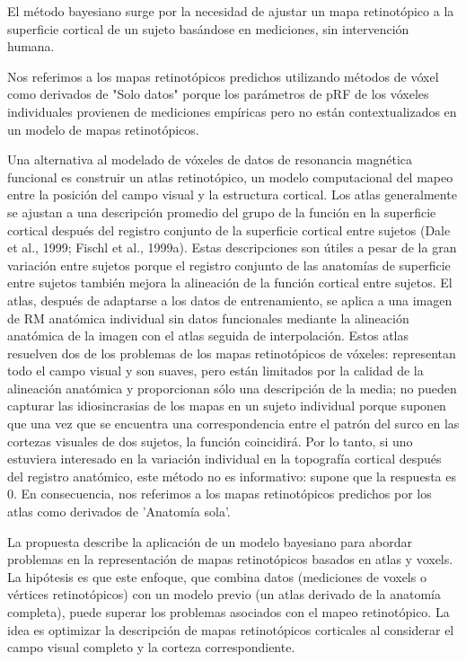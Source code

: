 El m\'etodo bayesiano surge por la necesidad de ajustar un mapa retinotópico a la superficie cortical de un sujeto basándose en mediciones, sin intervención humana. 

 Nos referimos a los mapas retinotópicos predichos utilizando métodos de vóxel como derivados de "Solo datos" porque los parámetros de pRF de los vóxeles individuales provienen de mediciones empíricas pero no están contextualizados en un modelo de mapas retinotópicos.

Una alternativa al modelado de vóxeles de datos de resonancia magnética funcional es construir un atlas retinotópico, un modelo computacional del mapeo entre la posición del campo visual y la estructura cortical. Los atlas generalmente se ajustan a una descripción promedio del grupo de la función en la superficie cortical después del registro conjunto de la superficie cortical entre sujetos (Dale et al., 1999; Fischl et al., 1999a). Estas descripciones son útiles a pesar de la gran variación entre sujetos porque el registro conjunto de las anatomías de superficie entre sujetos también mejora la alineación de la función cortical entre sujetos. El atlas, después de adaptarse a los datos de entrenamiento, se aplica a una imagen de RM anatómica individual sin datos funcionales mediante la alineación anatómica de la imagen con el atlas seguida de interpolación. Estos atlas resuelven dos de los problemas de los mapas retinotópicos de vóxeles: representan todo el campo visual y son suaves, pero están limitados por la calidad de la alineación anatómica y proporcionan sólo una descripción de la media; no pueden capturar las idiosincrasias de los mapas en un sujeto individual porque suponen que una vez que se encuentra una correspondencia entre el patrón del surco en las cortezas visuales de dos sujetos, la función coincidirá. Por lo tanto, si uno estuviera interesado en la variación individual en la topografía cortical después del registro anatómico, este método no es informativo: supone que la respuesta es 0. En consecuencia, nos referimos a los mapas retinotópicos predichos por los atlas como derivados de 'Anatomía sola'.

La propuesta describe la aplicación de un modelo bayesiano para abordar problemas en la representación de mapas retinotópicos basados en atlas y voxels. La hipótesis es que este enfoque, que combina datos (mediciones de voxels o vértices retinotópicos) con un modelo previo (un atlas derivado de la anatomía completa), puede superar los problemas asociados con el mapeo retinotópico. La idea es optimizar la descripción de mapas retinotópicos corticales al considerar el campo visual completo y la corteza correspondiente.

